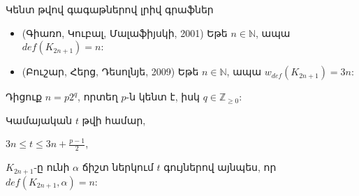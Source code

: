\begin{frame}{Կենտ թվով գագաթներով լրիվ գրաֆներ}
\begin{itemize}
    \item (Գիառո, Կուբալ, Մալաֆիյսկի, 2001)
    Եթե $n\in \mathbb{N}$, ապա $def(K_{2n+1})=n$:    
    \item (Բուշար, Հերց, Դեսոլնյե, 2009) Եթե  $n\in \mathbb{N}$, ապա $w_{def}(K_{2n+1})=3n$:    
\end{itemize}

\begin{theorem}[3.1.12]
Դիցուք $n=p2^q$, որտեղ $p$-ն կենտ է, իսկ $q \in \mathbb{Z}_{\geq 0}$: 

Կամայական $t$ թվի համար,
\begin{center}
$3n \leq t \leq 3n + \frac{p-1}{2}$,
\end{center} $K_{2n+1}$-ը ունի $\alpha$ ճիշտ ներկում $t$ գույներով այնպես, որ $def(K_{2n+1},\alpha)=n$:
\end{theorem}
\end{frame}
